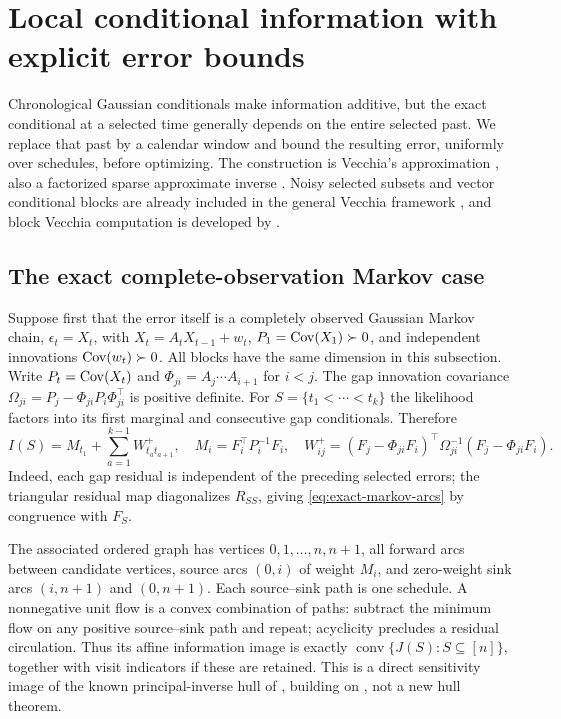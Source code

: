 \section{Local conditional information with explicit error bounds}
\label{sec:locality}
Chronological Gaussian conditionals make information additive, but the exact
conditional at a selected time generally depends on the entire selected past.
We replace that past by a calendar window and bound the resulting error,
uniformly over schedules, before optimizing. The construction is Vecchia's
approximation \citep[Section 3.1]{Vecchia1988}, also a factorized sparse
approximate inverse \citep{Schafer2021,Huan2025,KaminetzWebber2026}. Noisy
selected subsets and vector conditional blocks are already included in the
general Vecchia framework \citep[Section 2]{KatzfussGuinness2021}, and block
Vecchia computation is developed by \citet{Pan2025}.

\subsection{The exact complete-observation Markov case}
\label{subsec:exact-markov}
Suppose first that the error itself is a completely observed Gaussian Markov
chain, $\epsilon_t=X_t$, with
$X_t=A_tX_{t-1}+w_t$, $P_1=\operatorname{Cov}(X_1)\succ0$, and independent innovations
$\operatorname{Cov}(w_t)\succ0$. All blocks have the same dimension in this subsection.
Write $P_t=\operatorname{Cov}(X_t)$ and $\Phi_{ji}=A_j\cdots A_{i+1}$ for $i<j$.
The gap innovation covariance
$\Omega_{ji}=P_j-\Phi_{ji}P_i\Phi_{ji}^{\top}$ is positive definite.
For $S=\{t_1<\cdots<t_k\}$ the likelihood factors into its first marginal
and consecutive gap conditionals. Therefore
\begin{equation}
 I(S)=M_{t_1}+\sum_{a=1}^{k-1} W^+_{t_at_{a+1}},\quad
 M_i=F_i^\top P_i^{-1}F_i,\quad
 W^+_{ij}=(F_j-\Phi_{ji}F_i)^\top\Omega_{ji}^{-1}
                       (F_j-\Phi_{ji}F_i).
 \label{eq:exact-markov-arcs}
\end{equation}
Indeed, each gap residual is independent of the preceding selected errors;
the triangular residual map diagonalizes $R_{SS}$, giving
\eqref{eq:exact-markov-arcs} by congruence with $F_S$.

The associated ordered graph has vertices $0,1,\ldots,n,n+1$, all forward
arcs between candidate vertices, source arcs $(0,i)$ of weight $M_i$, and
zero-weight sink arcs $(i,n+1)$ and $(0,n+1)$. Each source--sink path is one
schedule. A nonnegative unit flow is a convex combination of paths: subtract
the minimum flow on any positive source--sink path and repeat; acyclicity
precludes a residual circulation. Thus its affine information image is exactly
$\operatorname{conv}\{J(S):S\subseteq[n]\}$, together with visit indicators
if these are retained. This is a direct sensitivity image of the known
principal-inverse hull of \citet{Lee2026}, building on \citet{Wei2023},
not a new hull theorem.

